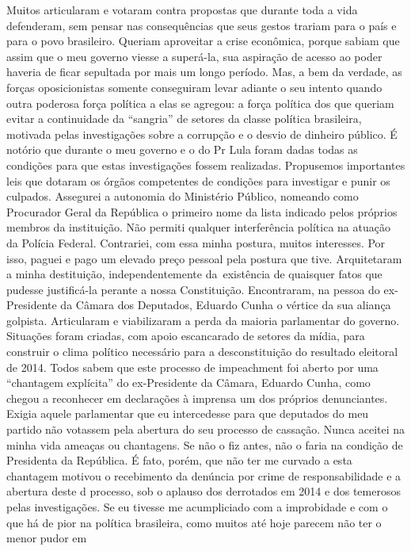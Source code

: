 Muitos articularam e votaram contra propostas que durante toda a vida
defenderam, sem pensar nas consequências que seus gestos trariam para o
país e para o povo brasileiro. Queriam aproveitar a crise econômica,
porque sabiam que assim que o meu governo viesse a superá-la, sua
aspiração de acesso ao poder haveria de ficar sepultada por mais um
longo período. Mas, a bem da verdade, as forças oposicionistas somente
conseguiram levar adiante o seu intento quando outra poderosa força
política a elas se agregou: a força política dos que queriam evitar a
continuidade da ``sangria'' de setores da classe política brasileira,
motivada pelas investigações sobre a corrupção e o desvio de dinheiro
público. É notório que durante o meu governo e o do Pr Lula foram dadas
todas as condições para que estas investigações fossem realizadas.
Propusemos importantes leis que dotaram os órgãos competentes de
condições para investigar e punir os culpados. Assegurei a autonomia do
Ministério Público, nomeando como Procurador Geral da República o
primeiro nome da lista indicado pelos próprios membros da instituição.
Não permiti qualquer interferência política na atuação da Polícia
Federal. Contrariei, com essa minha postura, muitos interesses. Por
isso, paguei e pago um elevado preço pessoal pela postura que tive.
Arquitetaram a minha destituição, independentemente da~existência de
quaisquer fatos que pudesse justificá-la perante a nossa Constituição.
Encontraram, na pessoa do ex-Presidente da Câmara dos Deputados, Eduardo
Cunha o vértice da sua aliança golpista. Articularam e viabilizaram a
perda da maioria parlamentar do governo. Situações foram criadas, com
apoio escancarado de setores da mídia, para construir o clima político
necessário para a desconstituição do resultado eleitoral de 2014. Todos
sabem que este processo de impeachment foi aberto por uma ``chantagem
explícita'' do ex-Presidente da Câmara, Eduardo Cunha, como chegou a
reconhecer em declarações à imprensa um dos próprios denunciantes.
Exigia aquele parlamentar que eu intercedesse para que deputados do meu
partido não votassem pela abertura do seu processo de cassação. Nunca
aceitei na minha vida ameaças ou chantagens. Se não o fiz antes, não o
faria na condição de Presidenta da República. É fato, porém, que não ter
me curvado a esta chantagem motivou o recebimento da denúncia por crime
de responsabilidade e a abertura deste d processo, sob o aplauso dos
derrotados em 2014 e dos temerosos pelas investigações. Se eu tivesse me
acumpliciado com a improbidade e com o que há de pior na política
brasileira, como muitos até hoje parecem não ter o menor pudor em
